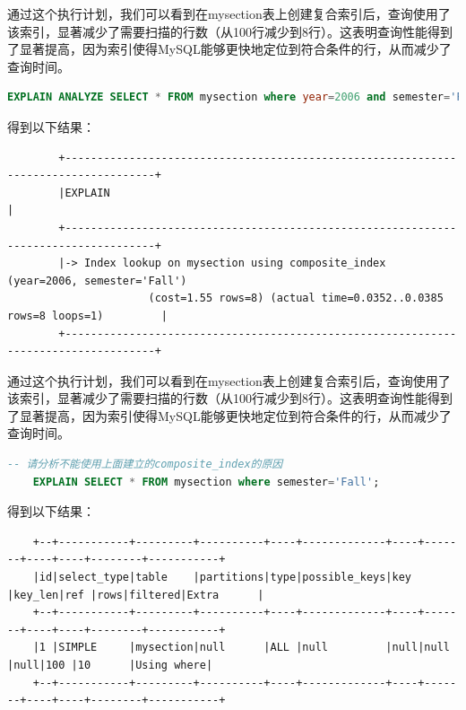 \documentclass{article}
\begin{document}
	通过这个执行计划，我们可以看到在mysection表上创建复合索引后，查询使用了该索引，显著减少了需要扫描的行数（从100行减少到8行）。这表明查询性能得到了显著提高，因为索引使得MySQL能够更快地定位到符合条件的行，从而减少了查询时间。
	
	\begin{lstlisting}[language=sql, title=索引对查询性能的影响, tabsize=4]
	EXPLAIN ANALYZE SELECT * FROM mysection where year=2006 and semester='Fall';
	\end{lstlisting}
	
	得到以下结果：
	
	\begin{verbatim}
		+------------------------------------------------------------------------------------+
		|EXPLAIN                                                                             |
		+------------------------------------------------------------------------------------+
		|-> Index lookup on mysection using composite_index (year=2006, semester='Fall') 
		              (cost=1.55 rows=8) (actual time=0.0352..0.0385 rows=8 loops=1)         |
		+------------------------------------------------------------------------------------+
	\end{verbatim}
	
	通过这个执行计划，我们可以看到在mysection表上创建复合索引后，查询使用了该索引，显著减少了需要扫描的行数（从100行减少到8行）。这表明查询性能得到了显著提高，因为索引使得MySQL能够更快地定位到符合条件的行，从而减少了查询时间。
	
	\begin{lstlisting}[language=sql, title=索引对查询性能的影响, tabsize=4]
	-- 请分析不能使用上面建立的composite_index的原因
	EXPLAIN SELECT * FROM mysection where semester='Fall';
	\end{lstlisting}
	
	得到以下结果：
	
	\begin{verbatim}
	+--+-----------+---------+----------+----+-------------+----+-------+----+----+--------+-----------+
	|id|select_type|table    |partitions|type|possible_keys|key |key_len|ref |rows|filtered|Extra      |
	+--+-----------+---------+----------+----+-------------+----+-------+----+----+--------+-----------+
	|1 |SIMPLE     |mysection|null      |ALL |null         |null|null   |null|100 |10      |Using where|
	+--+-----------+---------+----------+----+-------------+----+-------+----+----+--------+-----------+
	\end{verbatim}
	
\end{document}
